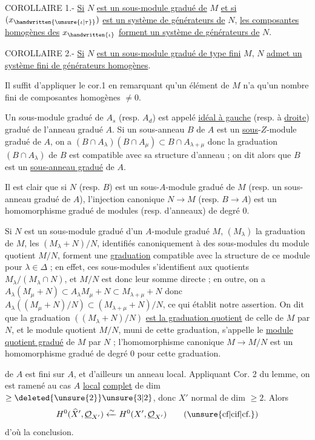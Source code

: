 COROLLAIRE 1.- \uline{Si} $N$ \uline{est un sous-module gradué de} $M$ \uline{et si} $(x_{\handwritten{\unsure{\iota|\tau}}})$ \uline{est un système de générateurs de} $N$, \uline{les composantes homogènes des} $x_{\handwritten{\iota}}$ \uline{forment un système de générateurs de} $N$.

COROLLAIRE 2.- \uline{Si} $N$ \uline{est un sous-module gradué de type fini} $M$, $N$ \uline{admet un système fini de générateurs homogènes}.

Il suffit d'appliquer le cor.1 en remarquant qu'un élément de $M$ n'a qu'un nombre fini de composantes homogènes $\ne 0$.

Un sous-module gradué de $A_s$ (resp. $A_d$) est appelé \uline{idéal à gauche} (resp. à \uline{droite}) gradué de l'anneau gradué $A$. Si un sous-anneau $B$ de $A$ est un \uline{sous}-$Z$-module gradué de $A$, on a $(B\cap A_\lambda)(B\cap A_\mu)\subset B\cap A_{\lambda+\mu}$ donc la graduation $(B\cap A_\lambda)$ de $B$ est compatible avec sa structure d'anneau ; on dit alors que $B$ est un \uline{sous-anneau gradué} de $A$.

Il est clair que si $N$ (resp. $B$) est un sous-$A$-module gradué de $M$ (resp. un sous-anneau gradué de $A$), l'injection canonique $N\to M$ (resp. $B\to A$) est un homomorphisme gradué de modules (resp. d'anneaux) de degré 0.

Si $N$ est un sous-module gradué d'un $A$-module gradué $M$, $(M_\lambda)$ la graduation de $M$, les $(M_\lambda+N)/N$, identifiés canoniquement à des sous-modules du module quotient $M/N$, forment une \uline{graduation} compatible avec la structure de ce module pour $\lambda\in\Delta$ ; en effet, ces sous-modules s'identifient aux quotients $M_\lambda/(M_\lambda\cap N)$, et $M/N$ est donc leur somme directe ; en outre, on a $A_\lambda(M_\mu+N)\subset A_\lambda M_\mu+N\subset M_{\lambda+\mu}+N$ donc $A_\lambda((M_\mu+N)/N)\subset(M_{\lambda+\mu}+N)/N$, ce qui établit notre assertion. On dit que la graduation $((M_\lambda+N)/N)$ \uline{est la graduation quotient} de celle de $M$ par $N$, et le module quotient $M/N$, muni de cette graduation, s'appelle le \uline{module quotient gradué} de $M$ par $N$ ; l'homomorphisme canonique $M\to M/N$ est un homomorphisme gradué de degré 0 pour cette graduation.

de $A$ est fini sur $A$, et d'ailleurs un anneau local. Appliquant Cor. 2 du lemme, on est ramené au cas $A$ \uline{local} \uline{complet}  de dim $\geq\deleted{\unsure{2}}\unsure{3|2}$, donc $X'$ normal de dim $\geq 2$. Alors
\[
 H^0(\widehat X',\underline{\mathcal O}_{X'})\xleftarrow{\sim}
 H^0(X',\underline{\mathcal O}_{X'})\qquad(\text{\unsure{cf|cif|cf.}})
\]
d'où la conclusion.

